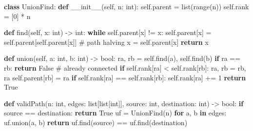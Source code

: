 \documentclass[11pt]{article}
\newenvironment{Shaded}{\begin{snugshade}}{\end{snugshade}}
\newcommand{\BuiltInTok}[1]{\textcolor[rgb]{0.50,0.55,0.55}{#1}}
\newcommand{\CommentTok}[1]{\textcolor[rgb]{0.48,0.49,0.49}{#1}}
\newcommand{\ControlFlowTok}[1]{\textcolor[rgb]{0.99,0.74,0.29}{\textbf{#1}}}
\newcommand{\DecValTok}[1]{\textcolor[rgb]{0.96,0.45,0.00}{#1}}
\newcommand{\FunctionTok}[1]{\textcolor[rgb]{0.56,0.27,0.68}{#1}}
\newcommand{\KeywordTok}[1]{\textcolor[rgb]{0.81,0.81,0.76}{\textbf{#1}}}
\newcommand{\NormalTok}[1]{\textcolor[rgb]{0.81,0.81,0.76}{#1}}
\newcommand{\OperatorTok}[1]{\textcolor[rgb]{0.81,0.81,0.76}{#1}}
\newcommand{\VariableTok}[1]{\textcolor[rgb]{0.15,0.68,0.68}{#1}}
\begin{document}
\begin{Shaded}
\begin{Highlighting}[]
\KeywordTok{class}\NormalTok{ UnionFind:}
    \KeywordTok{def} \FunctionTok{\_\_init\_\_}\NormalTok{(}\VariableTok{self}\NormalTok{, n: }\BuiltInTok{int}\NormalTok{):}
        \VariableTok{self}\NormalTok{.parent }\OperatorTok{=} \BuiltInTok{list}\NormalTok{(}\BuiltInTok{range}\NormalTok{(n))}
        \VariableTok{self}\NormalTok{.rank }\OperatorTok{=}\NormalTok{ [}\DecValTok{0}\NormalTok{] }\OperatorTok{*}\NormalTok{ n}

    \KeywordTok{def}\NormalTok{ find(}\VariableTok{self}\NormalTok{, x: }\BuiltInTok{int}\NormalTok{) }\OperatorTok{{-}\textgreater{}} \BuiltInTok{int}\NormalTok{:}
        \ControlFlowTok{while} \VariableTok{self}\NormalTok{.parent[x] }\OperatorTok{!=}\NormalTok{ x:}
            \VariableTok{self}\NormalTok{.parent[x] }\OperatorTok{=} \VariableTok{self}\NormalTok{.parent[}\VariableTok{self}\NormalTok{.parent[x]]  }\CommentTok{\# path halving}
\NormalTok{            x }\OperatorTok{=} \VariableTok{self}\NormalTok{.parent[x]}
        \ControlFlowTok{return}\NormalTok{ x}

    \KeywordTok{def}\NormalTok{ union(}\VariableTok{self}\NormalTok{, a: }\BuiltInTok{int}\NormalTok{, b: }\BuiltInTok{int}\NormalTok{) }\OperatorTok{{-}\textgreater{}} \BuiltInTok{bool}\NormalTok{:}
\NormalTok{        ra, rb }\OperatorTok{=} \VariableTok{self}\NormalTok{.find(a), }\VariableTok{self}\NormalTok{.find(b)}
        \ControlFlowTok{if}\NormalTok{ ra }\OperatorTok{==}\NormalTok{ rb:}
            \ControlFlowTok{return} \VariableTok{False}  \CommentTok{\# already connected}
        \ControlFlowTok{if} \VariableTok{self}\NormalTok{.rank[ra] }\OperatorTok{\textless{}} \VariableTok{self}\NormalTok{.rank[rb]:}
\NormalTok{            ra, rb }\OperatorTok{=}\NormalTok{ rb, ra}
        \VariableTok{self}\NormalTok{.parent[rb] }\OperatorTok{=}\NormalTok{ ra}
        \ControlFlowTok{if} \VariableTok{self}\NormalTok{.rank[ra] }\OperatorTok{==} \VariableTok{self}\NormalTok{.rank[rb]:}
            \VariableTok{self}\NormalTok{.rank[ra] }\OperatorTok{+=} \DecValTok{1}
        \ControlFlowTok{return} \VariableTok{True}

\KeywordTok{def}\NormalTok{ validPath(n: }\BuiltInTok{int}\NormalTok{, edges: }\BuiltInTok{list}\NormalTok{[}\BuiltInTok{list}\NormalTok{[}\BuiltInTok{int}\NormalTok{]], source: }\BuiltInTok{int}\NormalTok{, destination: }\BuiltInTok{int}\NormalTok{) }\OperatorTok{{-}\textgreater{}} \BuiltInTok{bool}\NormalTok{:}
    \ControlFlowTok{if}\NormalTok{ source }\OperatorTok{==}\NormalTok{ destination:}
        \ControlFlowTok{return} \VariableTok{True}
\NormalTok{    uf }\OperatorTok{=}\NormalTok{ UnionFind(n)}
    \ControlFlowTok{for}\NormalTok{ a, b }\KeywordTok{in}\NormalTok{ edges:}
\NormalTok{        uf.union(a, b)}
    \ControlFlowTok{return}\NormalTok{ uf.find(source) }\OperatorTok{==}\NormalTok{ uf.find(destination)}
\end{Highlighting}
\end{Shaded}
\end{document}
